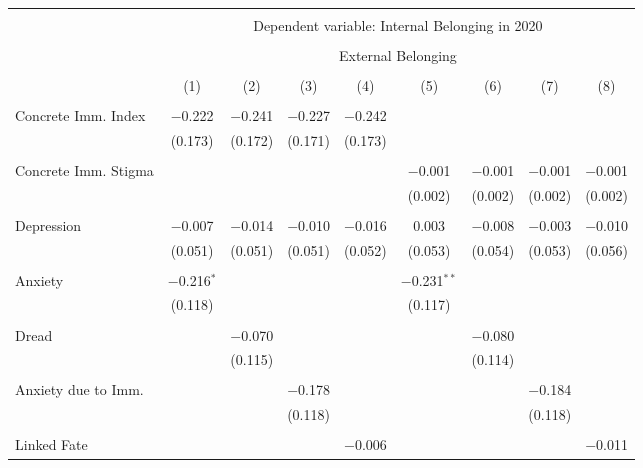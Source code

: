
\begin{table}[!htbp] \centering 
  \caption{} 
  \label{} 
\begin{tabular}{@{\extracolsep{5pt}}lcccccccc} 
\\[-1.8ex]\hline 
\hline \\[-1.8ex] 
 & \multicolumn{8}{c}{Dependent variable: Internal Belonging in 2020} \\ 
\cline{2-9} 
\\[-1.8ex] & \multicolumn{8}{c}{External Belonging} \\ 
\\[-1.8ex] & (1) & (2) & (3) & (4) & (5) & (6) & (7) & (8)\\ 
\hline \\[-1.8ex] 
 Concrete Imm. Index & $-$0.222 & $-$0.241 & $-$0.227 & $-$0.242 &  &  &  &  \\ 
  & (0.173) & (0.172) & (0.171) & (0.173) &  &  &  &  \\ 
  & & & & & & & & \\ 
 Concrete Imm. Stigma &  &  &  &  & $-$0.001 & $-$0.001 & $-$0.001 & $-$0.001 \\ 
  &  &  &  &  & (0.002) & (0.002) & (0.002) & (0.002) \\ 
  & & & & & & & & \\ 
 Depression & $-$0.007 & $-$0.014 & $-$0.010 & $-$0.016 & 0.003 & $-$0.008 & $-$0.003 & $-$0.010 \\ 
  & (0.051) & (0.051) & (0.051) & (0.052) & (0.053) & (0.054) & (0.053) & (0.056) \\ 
  & & & & & & & & \\ 
 Anxiety & $-$0.216$^{*}$ &  &  &  & $-$0.231$^{**}$ &  &  &  \\ 
  & (0.118) &  &  &  & (0.117) &  &  &  \\ 
  & & & & & & & & \\ 
 Dread &  & $-$0.070 &  &  &  & $-$0.080 &  &  \\ 
  &  & (0.115) &  &  &  & (0.114) &  &  \\ 
  & & & & & & & & \\ 
 Anxiety due to Imm. &  &  & $-$0.178 &  &  &  & $-$0.184 &  \\ 
  &  &  & (0.118) &  &  &  & (0.118) &  \\ 
  & & & & & & & & \\ 
 Linked Fate &  &  &  & $-$0.006 &  &  &  & $-$0.011 \\ 

\end{tabular}
\end{table}
